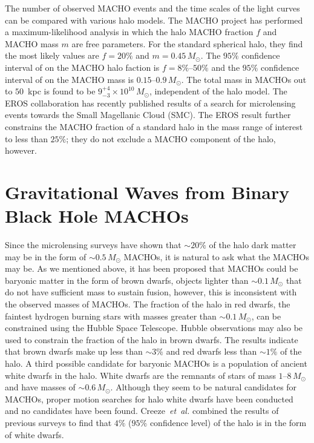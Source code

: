 The number of observed MACHO events and the time scales of the light curves
can be compared with various halo models. The MACHO project has performed a
maximum-likelihood analysis in which the halo MACHO fraction $f$ and MACHO
mass $m$ are free parameters. For the standard spherical halo, they find the
most likely values are $f = 20\%$ and $m = 0.45\,M_\odot$. The $95\%$
confidence interval of on the MACHO halo faction is $f = 8\%$--$50\%$ and the
$95\%$ confidence interval of on the MACHO mass is $0.15$--$0.9\,M_\odot$. The
total mass in MACHOs out to $50$~kpc is found to be $9_{-3}^{+4} \times
10^{10}\,M_\odot$, independent of the halo model\cite{Alcock:2000ph}.  The
EROS collaboration has recently published results of a search for microlensing
events towards the Small Magellanic Cloud (SMC)\cite{Afonso:2002xq}. The EROS
result further constrains the MACHO fraction of a standard halo in the mass
range of interest to less than $25\%$; they do not exclude a MACHO component
of the halo, however.

\section{Gravitational Waves from Binary Black Hole MACHOs}
\label{s:bbhmacho}

Since the microlensing surveys have shown that $\sim 20\%$ of the halo dark
matter may be in the form of $\sim 0.5\,M_\odot$ MACHOs, it is natural to ask
what the MACHOs may be. As we mentioned above, it has been proposed that
MACHOs could be baryonic matter in the form of brown dwarfs, objects lighter
than $\sim 0.1\,M_\odot$ that do not have sufficient mass to sustain fusion,
however, this is inconsistent with the observed masses of MACHOs. The fraction
of the halo in red dwarfs, the faintest hydrogen burning stars with masses
greater than $\sim 0.1\,M_\odot$, can be constrained using the Hubble Space
Telescope. Hubble observations may also be used to constrain the fraction of
the halo in brown dwarfs. The results indicate that brown dwarfs make up less
than $\sim 3\%$ and red dwarfs less than $\sim 1\%$ of the
halo\cite{Graff:1995ru,Graff:1996rz}.  A third possible candidate for baryonic
MACHOs is a population of ancient white dwarfs in the halo. White dwarfs are
the remnants of stars of mass $1$--$8\,M_\odot$ and have masses of $\sim
0.6\,M_\odot$. Although they seem to be natural candidates for MACHOs,
proper motion searches for halo white dwarfs have been conducted and no candidates have
been found\cite{2002A&A...389L..69G,2002ApJ...573..644N,Creze:2004gs}.
Creeze~\emph{et~al.} combined the results of previous surveys to find that
$4\%$ ($95\%$ confidence level) of the halo is in the form of white
dwarfs\cite{Creze:2004gs}. 

